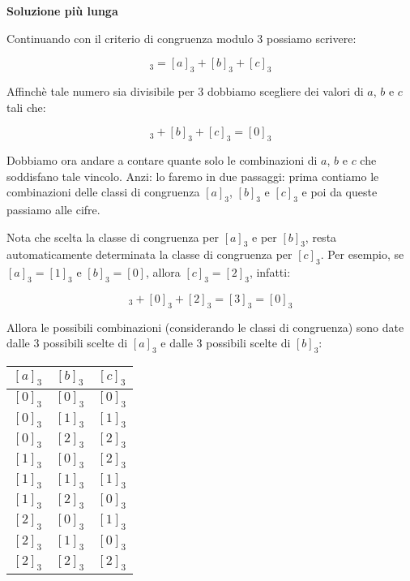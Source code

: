 \begin{soluzione}
    \bigskip
    \textbf{Soluzione più lunga}

    Continuando con il criterio di congruenza modulo 3 possiamo scrivere:

    \begin{equation*}
        [a + b + c]_3 = [a]_3 + [b]_3 + [c]_3
    \end{equation*}

    Affinchè tale numero sia divisibile per 3 dobbiamo scegliere dei valori di $a$, $b$ e $c$ tali che:

    \begin{equation*}
        [a]_3 + [b]_3 + [c]_3 = [0]_3
    \end{equation*}

    Dobbiamo ora andare a contare quante solo le combinazioni di $a$, $b$ e $c$ che soddisfano tale vincolo. Anzi: lo
    faremo in due passaggi: prima contiamo le combinazioni delle classi di congruenza $[a]_3$, $[b]_3$ e $[c]_3$ e poi
    da queste passiamo alle cifre.

    Nota che scelta la classe di congruenza per $[a]_3$ e per $[b]_3$, resta automaticamente determinata la classe di
    congruenza per $[c]_3$.
    Per esempio, se $[a]_3 = [1]_3$ e $[b]_3 = [0]$, allora $[c]_3 =  [2]_3$, infatti:

    \begin{equation*}
        [1]_3 + [0]_3 + [2]_3 = [3]_3 = [0]_3
    \end{equation*}

    Allora le possibili combinazioni (considerando le classi di congruenza) sono date dalle 3 possibili scelte di $[a]_3$
    e dalle 3 possibili scelte di $[b]_3$:

    \begin{table}[H]
        \label{tab:distrettuali_2019_1}
        \centering
        \begin{tabular}{ccc}
            \toprule
            $[a]_3$ & $[b]_3$ & $[c]_3$ \\
            \midrule
            $[0]_3$ & $[0]_3$ & $[0]_3$ \\
            $[0]_3$ & $[1]_3$ & $[1]_3$ \\
            $[0]_3$ & $[2]_3$ & $[2]_3$ \\
            $[1]_3$ & $[0]_3$ & $[2]_3$ \\
            $[1]_3$ & $[1]_3$ & $[1]_3$ \\
            $[1]_3$ & $[2]_3$ & $[0]_3$ \\
            $[2]_3$ & $[0]_3$ & $[1]_3$ \\
            $[2]_3$ & $[1]_3$ & $[0]_3$ \\
            $[2]_3$ & $[2]_3$ & $[2]_3$ \\
            \bottomrule
        \end{tabular}
    \end{table}


\end{soluzione}
